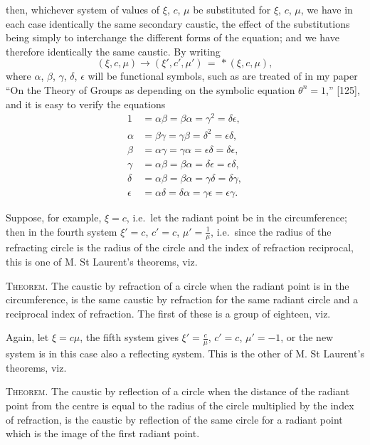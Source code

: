\documentclass[11pt,a4paper]{book}
\begin{document}
then, whichever system of values of $\xi$, $c$, $\mu$ be substituted for $\xi$, $c$, $\mu$, we have in
each case identically the same secondary caustic, the effect of the substitutions being
simply to interchange the different forms of the equation; and we have therefore
identically the same caustic. By writing
\[
(\xi, c, \mu) \to (\xi', c', \mu')
\,=\, * (\xi, c, \mu),
\]
where $\alpha$, $\beta$, $\gamma$, $\delta$, $\epsilon$ will be functional symbols, such as are treated of in my paper ``On the
Theory of Groups as depending on the symbolic equation $\theta^n=1$,'' [125], and it is
easy to verify the equations
\begin{align*}
1 &= \alpha\beta = \beta\alpha = \gamma^2 = \delta\epsilon, \\
\alpha &= \beta\gamma = \gamma\beta = \delta^2 = \epsilon\delta, \\
\beta &= \alpha\gamma = \gamma\alpha = \epsilon\delta = \delta\epsilon, \\
\gamma &= \alpha\beta = \beta\alpha = \delta\epsilon = \epsilon\delta, \\
\delta &= \alpha\beta = \beta\alpha = \gamma\delta = \delta\gamma, \\
\epsilon &= \alpha\delta = \delta\alpha = \gamma\epsilon = \epsilon\gamma.
\end{align*}

\medskip

Suppose, for example, $\xi = c$, i.e.\ let the radiant point be in the circumference; then in the fourth system $\xi' = c$, $c' = c$, $\mu' = \tfrac{1}{\mu}$, i.e.\ since the radius of the refracting circle is the radius of the circle and the index of refraction reciprocal, this is one of M. St Laurent's theorems, viz.

\smallskip

\textsc{Theorem.} The caustic by refraction of a circle when the radiant point is in the circumference, is the same caustic by refraction for the same radiant circle and a reciprocal index of refraction. The first of these is a group of eighteen, viz.\

\smallskip

Again, let $\xi = c\mu$, the fifth system gives $\xi' = \tfrac{c}{\mu}$, $c' = c$, $\mu' = -1$, or the new system
is in this case also a reflecting system. This is the other of M. St Laurent's
theorems, viz.

\smallskip

\textsc{Theorem.} The caustic by reflection of a circle when the distance of the radiant
point from the centre is equal to the radius of the circle multiplied by the index of
refraction, is the caustic by reflection of the same circle for a radiant point which is
the image of the first radiant point.
\end{document}
